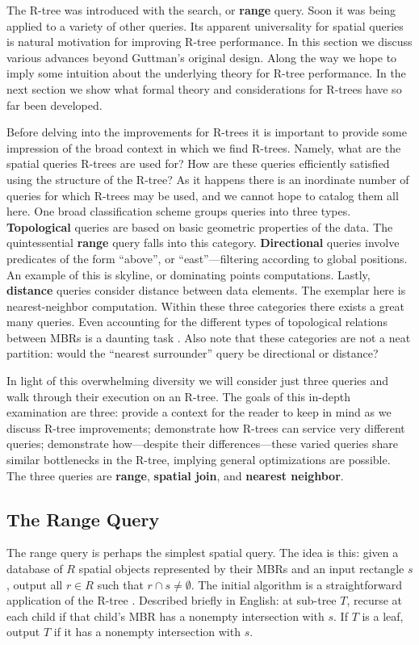 \newcommand{\keyword}[1]{\textbf{#1}}

The R-tree was introduced with the search, or \keyword{range} query.
Soon it was being applied to a variety of other queries.
Its apparent universality for spatial queries is natural motivation for improving R-tree performance.
In this section we discuss various advances beyond Guttman's original design.
Along the way we hope to imply some intuition about the underlying theory for R-tree performance.
In the next section we show what formal theory and considerations for R-trees have so far been developed.

Before delving into the improvements for R-trees it is important to provide some impression of the broad context in which we find R-trees.
Namely, what are the spatial queries R-trees are used for?
How are these queries efficiently satisfied using the structure of the R-tree?
As it happens there is an inordinate number of queries for which R-trees may be used, and we cannot hope to catalog them all here.
One broad classification scheme groups queries into three types.
\keyword{Topological} queries are based on basic geometric properties of the data.
The quintessential \keyword{range} query falls into this category.
\keyword{Directional} queries involve predicates of the form ``above'', or ``east''---filtering according to global positions.
An example of this is skyline, or dominating points computations.
Lastly, \keyword{distance} queries consider distance between data elements.
The exemplar here is nearest-neighbor computation.
Within these three categories there exists a great many queries.
Even accounting for the different types of topological relations between MBRs is a daunting task \cite{papadiastheodoridissellisegenhofer95}.
Also note that these categories are not a neat partition: would the ``nearest surrounder'' query be directional or distance?

In light of this overwhelming diversity we will consider just three queries and walk through their execution on an R-tree.
The goals of this in-depth examination are three:
provide a context for the reader to keep in mind as we discuss R-tree improvements;
demonstrate how R-trees can service very different queries;
demonstrate how---despite their differences---these varied queries share similar bottlenecks in the R-tree, implying general optimizations are possible.
The three queries are \keyword{range}, \keyword{spatial join}, and \keyword{nearest neighbor}.

\subsection{The Range Query}
The range query is perhaps the simplest spatial query.
The idea is this: given a database of $R$ spatial objects represented by their MBRs and an input rectangle $s$, output all $r\in R$ such that $r\cap s\neq\emptyset$.
The initial algorithm is a straightforward application of the R-tree \cite{guttman84}.
Described briefly in English: at sub-tree $T$, recurse at each child if that child's MBR has a nonempty intersection with $s$.
If $T$ is a leaf, output $T$ if it has a nonempty intersection with $s$.

